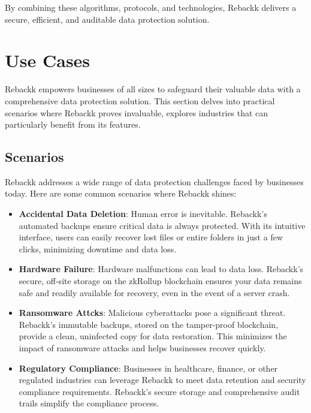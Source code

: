 \documentclass[12pt]{article}
\begin{document}
By combining these algorithms, protocols, and technologies, Rebackk delivers a secure, efficient, and auditable data protection solution.

\section{Use Cases}
Rebackk empowers businesses of all sizes to safeguard their valuable data with a comprehensive data protection solution. This section delves into practical scenarios where Rebackk proves invaluable, explores industries that can particularly benefit from its features.

\subsection{Scenarios}
Rebackk addresses a wide range of data protection challenges faced by businesses today. Here are some common scenarios where Rebackk shines:

\begin{itemize}
    \item \textbf{Accidental Data Deletion}: Human error is inevitable. Rebackk's automated backups ensure critical data is always protected. With its intuitive interface, users can easily recover lost files or entire folders in just a few clicks, minimizing downtime and data loss.
    \item \textbf{Hardware Failure}: Hardware malfunctions can lead to data loss. Rebackk's secure, off-site storage on the zkRollup blockchain ensures your data remains safe and readily available for recovery, even in the event of a server crash.
    \item \textbf{Ransomware Attcks}:  Malicious cyberattacks pose a significant threat. Rebackk's immutable backups, stored on the tamper-proof blockchain, provide a clean, uninfected copy for data restoration. This minimizes the impact of ransomware attacks and helps businesses recover quickly.
    \item \textbf{Regulatory Compliance}: Businesses in healthcare, finance, or other regulated industries can leverage Rebackk to meet data retention and security compliance requirements. Rebackk's secure storage and comprehensive audit trails simplify the compliance process.
\end{itemize}
\end{document}
